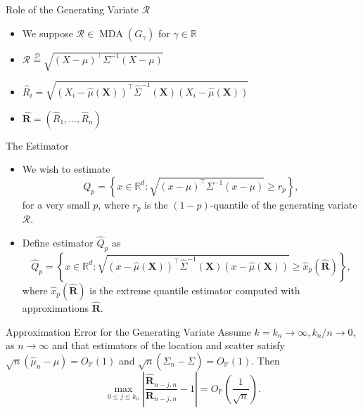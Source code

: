 \documentclass{beamer}
\newcommand{\Rg}{\mathcal{R}}
\DeclareMathOperator{\mda}{MDA}
\begin{document}
\begin{frame}{Role of the Generating Variate $\Rg$}
  \begin{itemize}
    \item We suppose $\mathcal{R}\in\mda\left(G_\gamma\right)$ for
    $\gamma\in\mathbb{R}$
    \pause
    \item $\Rg \stackrel{\mathcal{D}}{=} \sqrt{\left(X - \mu\right)^\intercal
    \Sigma^{-1}\left(X - \mu\right)}$
    \pause
    \item $\hat R_i = \sqrt{\left(X_i - \hat{\mu}(\bm
    X)\right)^\intercal\hat{\Sigma}^{-1}(\bm X)\left(X_i - \hat{\mu}(\bm
    X)\right)}$
    \item $\hat{\bm R} = (\hat R_1, \ldots, \hat R_n)$
  \end{itemize}
\end{frame}


\begin{frame}{The Estimator}
  \begin{itemize}
    \item We wish to estimate
    \begin{equation*}
      Q_{p} = \left\{x \in \mathbb{R}^d : \sqrt{\left(x - \mu\right)^\intercal
      \Sigma^{-1}\left(x - \mu\right)} \geq r_{p}\right\},
    \end{equation*}
    for a very small $p$, where $r_{p}$ is the $(1-p)$-quantile of the
    generating variate $\mathcal{R}$. \pause
    \item Define estimator $\hat Q_{p}$ as
    \begin{equation*}
      \hat Q_{p} = \left\{x \in \mathbb{R}^d :
      \sqrt{\left(x - \hat{\mu}(\bm X)\right)^\intercal\hat{\Sigma}^{-1}(\bm X)
      \left(x - \hat{\mu}(\bm X)\right)}
      \geq \hat x_{p}(\hat{\bm R})\right\},
    \end{equation*}
    where $\hat x_{p}(\hat{\bm R})$ is the extreme quantile estimator computed
    with approximations $\hat{\bm R}$.
  \end{itemize}
\end{frame}


\begin{frame}{Approximation Error for the Generating Variate}
  Assume $k = k_n\to\infty, k_n/n\to 0$, as $n\to\infty$ and that estimators of
		the location and scatter satisfy $\sqrt{n}\left(\hat\mu_n - \mu\right) =
		O_\mathbb{P}\left(1\right)$ and $\sqrt{n}\left(\hat\Sigma_n - \Sigma\right)
		= O_\mathbb{P}\left(1\right)$. Then
    \begin{equation*}
			\max_{0\leq j\leq k_n}\left|\frac{\hat{\bm R}_{n-j,n}}{\bm R_{n-j,n}}
			- 1\right| = O_\mathbb{P}\left(\frac{1}{\sqrt{n}}\right).
		\end{equation*}
\end{frame}
\end{document}
